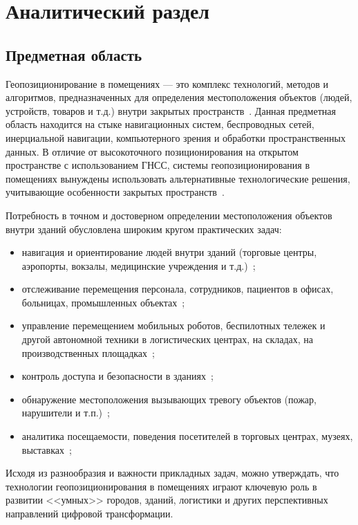 \chapter{Аналитический раздел}

\section{Предметная область}

Геопозиционирование в помещениях --- это комплекс технологий, методов и алгоритмов, предназначенных для определения местоположения объектов (людей, устройств, товаров и т.д.) внутри закрытых пространств~\cite{basebook}. Данная предметная область находится на стыке навигационных систем, беспроводных сетей, инерциальной навигации, компьютерного зрения и обработки пространственных данных. В отличие от высокоточного позиционирования на открытом пространстве с использованием ГНСС, системы геопозиционирования в помещениях вынуждены использовать альтернативные технологические решения, учитывающие особенности закрытых пространств~\cite{vislight}.

Потребность в точном и достоверном определении местоположения объектов внутри зданий обусловлена широким кругом практических задач:

\begin{itemize}[label=---]
    \item навигация и ориентирование людей внутри зданий (торговые центры, аэропорты, вокзалы, медицинские учреждения и т.д.)~\cite{intro};
    \item отслеживание перемещения персонала, сотрудников, пациентов в офисах, больницах, промышленных объектах~\cite{staffpos};
    \item управление перемещением мобильных роботов, беспилотных тележек и другой автономной техники в логистических центрах, на складах, на производственных площадках~\cite{basebook};
    \item контроль доступа и безопасности в зданиях~\cite{accesscontrol};
    \item обнаружение местоположения вызывающих тревогу объектов (пожар, нарушители и т.п.)~\cite{trespassers};
    \item аналитика посещаемости, поведения посетителей в торговых центрах, музеях, выставках~\cite{occupancy};
\end{itemize}

Исходя из разнообразия и важности прикладных задач, можно утверждать, что технологии геопозиционирования в помещениях играют ключевую роль в развитии <<умных>> городов, зданий, логистики и других перспективных направлений цифровой трансформации.

